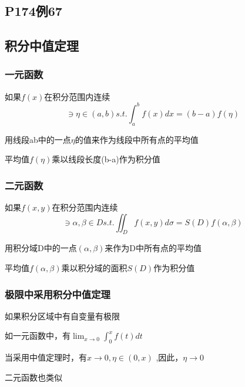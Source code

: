 \documentclass[a4paper]{ctexart}
\begin{document}
\begin{multicols}{2}
\section{P174例67}

\subsection{积分中值定理}

\subsubsection{一元函数}
\par 如果$f(x)$在积分范围内连续
\begin{equation}
\ni \eta \in (a,b) s.t. \int_{a}^{b}{f(x)dx} = (b-a)f(\eta)
\end{equation}
\par 用线段ab中的一点$\eta$的值来作为线段中所有点的平均值
\par 平均值$f(\eta)$乘以线段长度(b-a)作为积分值

\subsubsection{二元函数}
\par 如果$f(x,y)$在积分范围内连续
\begin{equation}
\ni \alpha , \beta \in D s.t. \iint_{D}{f(x,y)d\sigma}
= S(D)f(\alpha, \beta)
\end{equation}
\par 用积分域D中的一点$(\alpha,\beta)$来作为D中所有点的平均值
\par 平均值$f(\alpha, \beta)$乘以积分域的面积$S(D)$作为积分值

\subsubsection{极限中采用积分中值定理}
\par 如果积分区域中有自变量有极限
\par 如一元函数中，有$\lim_{x\rightarrow 0}{\int_{0}^{x}{f(t)dt}}$
\par 当采用中值定理时，有$x\rightarrow 0, \eta \in (0, x)$ ,因此，$\eta \rightarrow 0$
\par 二元函数也类似

\end{multicols}
\end{document}
